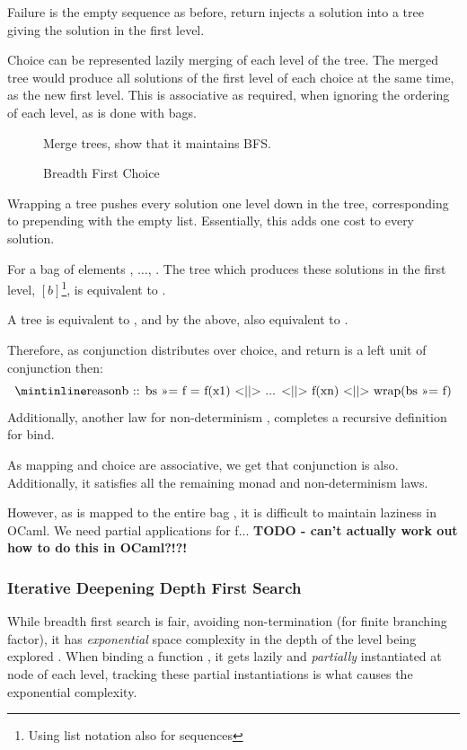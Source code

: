 Failure is the empty sequence as before, return injects a solution into a tree giving the solution in the first level. 

Choice can be represented lazily merging of each level of the tree. The merged tree would produce all solutions of the first level of each choice at the same time, as the new first level. This is associative as required, when ignoring the ordering of each level, as is done with bags. 

\begin{figure}[h]
Merge trees, show that it maintains BFS.
\caption{Breadth First Choice}
\end{figure}

Wrapping a tree pushes every solution one level down in the tree, corresponding to prepending with the empty list. Essentially, this adds one cost to every solution.

For a bag  of elements ,  $\dots$, . The tree which produces these solutions in the first level, $[b]$\footnote{Using list notation also for sequences}, is equivalent to .

A tree  is equivalent to , and by the above, also equivalent to .

Therefore, as conjunction distributes over choice, and return is a left unit of conjunction then:
\[\code{b :: bs >>= f     =    f(x1) <||> ... <||> f(xn) <||> wrap(bs >>= f)}\]
Additionally, another law for non-determinism , completes a recursive definition for bind.

As mapping and choice are associative, we get that conjunction is also. Additionally, it satisfies all the remaining monad and non-determinism laws. 

However, as  is mapped to the entire bag , it is difficult to maintain laziness in OCaml. We need partial applications for f... \textbf{TODO - can't actually work out how to do this in OCaml?!?!}

\subsubsection{Iterative Deepening Depth First Search}
While breadth first search is fair, avoiding non-termination (for finite branching factor), it has \textit{exponential} space complexity in the depth of the level being explored \cite{NorvigAI}. When binding a function , it gets lazily and \textit{partially} instantiated at node of each level, tracking these partial instantiations is what causes the exponential complexity.

